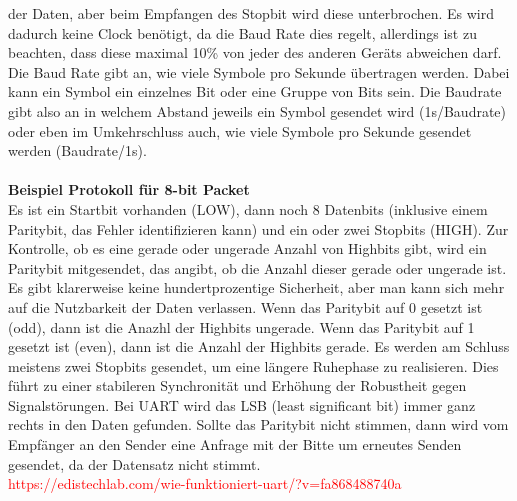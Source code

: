 \documentclass[titlepage,12pt,twoside]{article}
\begin{document}
der Daten, aber beim Empfangen des Stopbit wird diese unterbrochen. Es wird 
dadurch keine Clock benötigt, da die Baud Rate dies regelt, allerdings ist zu 
beachten, dass diese maximal 10\% von jeder des anderen Geräts abweichen darf. 
Die Baud Rate gibt an, wie viele Symbole pro Sekunde übertragen werden. Dabei 
kann ein Symbol ein einzelnes Bit oder eine Gruppe von Bits sein. Die Baudrate 
gibt also an in welchem Abstand jeweils ein Symbol gesendet wird (1s/Baudrate) 
oder eben im Umkehrschluss auch, wie viele Symbole pro Sekunde gesendet werden 
(Baudrate/1s). \\
\\
\textbf{Beispiel Protokoll für 8-bit Packet} \\
Es ist ein Startbit vorhanden (LOW), dann noch 8 Datenbits (inklusive einem 
Paritybit, das Fehler identifizieren kann) und ein oder zwei Stopbits (HIGH). 
Zur Kontrolle, ob es eine gerade oder ungerade Anzahl von Highbits gibt, wird 
ein Paritybit mitgesendet, das angibt, ob die Anzahl dieser gerade oder ungerade 
ist. Es gibt klarerweise keine hundertprozentige Sicherheit, aber man kann sich 
mehr auf die Nutzbarkeit der Daten verlassen. Wenn das Paritybit auf 0 gesetzt 
ist (odd), dann ist die Anazhl der Highbits ungerade. Wenn das Paritybit auf 1 
gesetzt ist (even), dann ist die Anzahl der Highbits gerade. Es werden am 
Schluss meistens zwei Stopbits gesendet, um eine längere Ruhephase zu realisieren. 
Dies führt zu einer stabileren Synchronität und Erhöhung der Robustheit gegen 
Signalstörungen. Bei UART wird das LSB (least significant bit) immer ganz rechts 
in den Daten gefunden. Sollte das Paritybit nicht stimmen, dann wird vom 
Empfänger an den Sender eine Anfrage mit der Bitte um erneutes Senden gesendet, 
da der Datensatz nicht stimmt. \\

\textcolor{red}{https://edistechlab.com/wie-funktioniert-uart/?v=fa868488740a}
\end{document}
